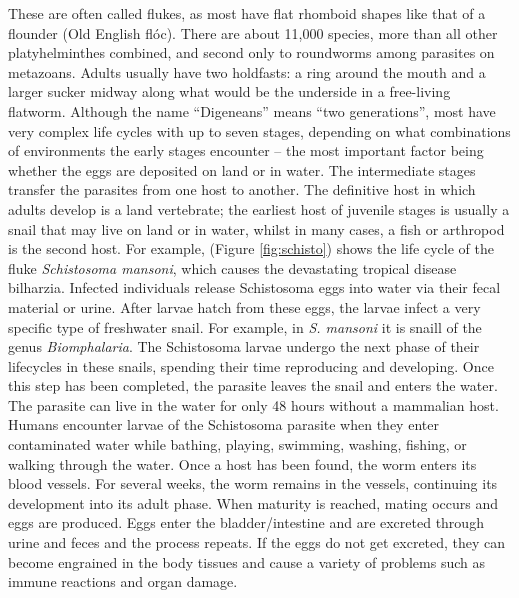 These are often called flukes, as most have flat rhomboid shapes like that of a flounder (Old English flóc). There are about 11,000 species, more than all other platyhelminthes combined, and second only to roundworms among parasites on metazoans. Adults usually have two holdfasts: a ring around the mouth and a larger sucker midway along what would be the underside in a free-living flatworm. Although the name ``Digeneans'' means ``two generations'', most have very complex life cycles with up to seven stages, depending on what combinations of environments the early stages encounter -- the most important factor being whether the eggs are deposited on land or in water. The intermediate stages transfer the parasites from one host to another. The definitive host in which adults develop is a land vertebrate; the earliest host of juvenile stages is usually a snail that may live on land or in water, whilst in many cases, a fish or arthropod is the second host. For example, (Figure \ref{fig:schisto}) shows the life cycle of the fluke \emph{Schistosoma mansoni}, which causes the devastating tropical disease bilharzia. Infected individuals release Schistosoma eggs into water via their fecal material or urine. After larvae hatch from these eggs, the larvae infect a very specific type of freshwater snail. For example, in \emph{S. mansoni} it is snaill of the genus \emph{Biomphalaria}. The Schistosoma larvae undergo the next phase of their lifecycles in these snails, spending their time reproducing and developing. Once this step has been completed, the parasite leaves the snail and enters the water. The parasite can live in the water for only 48 hours without a mammalian host. Humans encounter larvae of the Schistosoma parasite when they enter contaminated water while bathing, playing, swimming, washing, fishing, or walking through the water. Once a host has been found, the worm enters its blood vessels. For several weeks, the worm remains in the vessels, continuing its development into its adult phase. When maturity is reached, mating occurs and eggs are produced. Eggs enter the bladder/intestine and are excreted through urine and feces and the process repeats. If the eggs do not get excreted, they can become engrained in the body tissues and cause a variety of problems such as immune reactions and organ damage.



